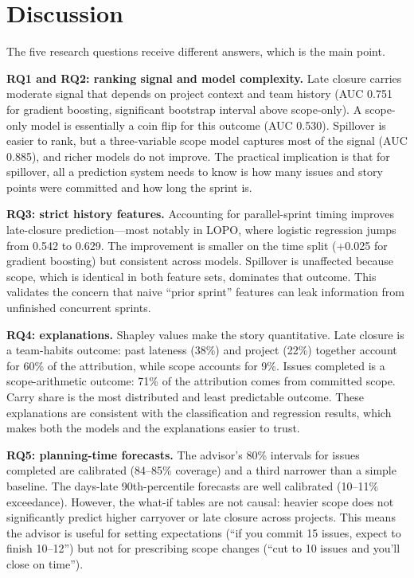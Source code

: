 \documentclass[conference]{IEEEtran}
\begin{document}
\section{Discussion}

The five research questions receive different answers, which is the main point.

\textbf{RQ1 and RQ2: ranking signal and model complexity.}
Late closure carries moderate signal that depends on project context and team history (AUC 0.751 for gradient boosting, significant bootstrap interval above scope-only).
A scope-only model is essentially a coin flip for this outcome (AUC 0.530).
Spillover is easier to rank, but a three-variable scope model captures most of the signal (AUC 0.885), and richer models do not improve.
The practical implication is that for spillover, all a prediction system needs to know is how many issues and story points were committed and how long the sprint is.

\textbf{RQ3: strict history features.}
Accounting for parallel-sprint timing improves late-closure prediction---most notably in LOPO, where logistic regression jumps from 0.542 to 0.629.
The improvement is smaller on the time split (+0.025 for gradient boosting) but consistent across models.
Spillover is unaffected because scope, which is identical in both feature sets, dominates that outcome.
This validates the concern that naive ``prior sprint'' features can leak information from unfinished concurrent sprints.

\textbf{RQ4: explanations.}
Shapley values make the story quantitative.
Late closure is a team-habits outcome: past lateness (38\%) and project (22\%) together account for 60\% of the attribution, while scope accounts for 9\%.
Issues completed is a scope-arithmetic outcome: 71\% of the attribution comes from committed scope.
Carry share is the most distributed and least predictable outcome.
These explanations are consistent with the classification and regression results, which makes both the models and the explanations easier to trust.

\textbf{RQ5: planning-time forecasts.}
The advisor's 80\% intervals for issues completed are calibrated (84--85\% coverage) and a third narrower than a simple baseline.
The days-late 90th-percentile forecasts are well calibrated (10--11\% exceedance).
However, the what-if tables are not causal: heavier scope does not significantly predict higher carryover or late closure across projects.
This means the advisor is useful for setting expectations (``if you commit 15 issues, expect to finish 10--12'') but not for prescribing scope changes (``cut to 10 issues and you'll close on time'').
\end{document}
